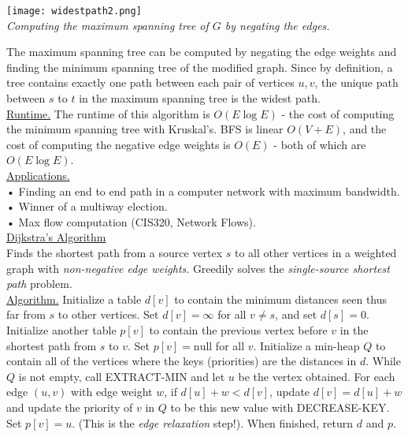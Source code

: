 \documentclass[12pt, fleqn]{general}
\begin{document}
\begin{multicols*}{2}
    \begin{center}
    \texttt{[image: widestpath2.png]}\\
    \emph{Computing the maximum spanning tree of $G$ by negating the edges.}
    \end{center}

    \newpage

    The maximum spanning tree can be computed by negating the edge weights and finding the minimum spanning tree of the modified graph. Since by definition, a tree contains exactly one path between each pair of vertices $u, v$, the unique path between $s$ to $t$ in the maximum spanning tree is the widest path.\\

    \underline{Runtime.} The runtime of this algorithm is $O(E \log E)$ - the cost of computing the minimum spanning tree with Kruskal's. BFS is linear $O(V + E)$, and the cost of computing the negative edge weights is $O(E)$ - both of which are $O(E \log E)$.\\

    \underline{Applications.}\\

    • Finding an end to end path in a computer network with maximum bandwidth.\\
    • Winner of a multiway election.\\
    • Max flow computation (CIS320, Network Flows).\\

    {\large \underline{Dijkstra's Algorithm}}\\

    Finds the shortest path from a source vertex $s$ to all other vertices in a weighted graph with \emph{non-negative edge weights}. Greedily solves the \emph{single-source shortest path} problem.\\

    \underline{Algorithm.} Initialize a table $d[v]$ to contain the minimum distances seen thus far from $s$ to other vertices. Set $d[v] = \infty$ for all $v \neq s$, and set $d[s] = 0$. Initialize another table $p[v]$ to contain the previous vertex before $v$ in the shortest path from $s$ to $v$. Set $p[v] = \text{null}$ for all $v$. Initialize a min-heap $Q$ to contain all of the vertices where the keys (priorities) are the distances in $d$. While $Q$ is not empty, call EXTRACT-MIN and let $u$ be the vertex obtained. For each edge $(u, v)$ with edge weight $w$, if $d[u] + w < d[v]$, update $d[v] = d[u] + w$ and
    update the priority of $v$ in $Q$ to be this new value with DECREASE-KEY. Set $p[v] = u$. (This is the \emph{edge relaxation} step!). When finished, return $d$ and $p$.\\


\end{multicols*}
\end{document}
